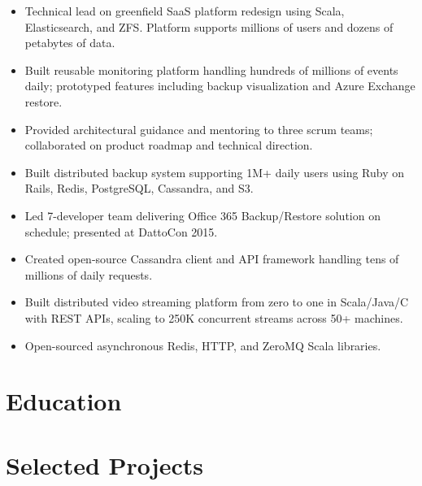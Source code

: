 \documentclass[11pt,a4paper,sans]{moderncv}
\begin{document}
{ \begin{itemize} \itemsep -2pt
  \item Technical lead on greenfield SaaS platform redesign using Scala, Elasticsearch, and ZFS. Platform supports millions of users and dozens of petabytes of data.
  \item Built reusable monitoring platform handling hundreds of millions of events daily; prototyped features including backup visualization and Azure Exchange restore.
  \item Provided architectural guidance and mentoring to three scrum teams; collaborated on product roadmap and technical direction.
 \end{itemize} }

{ \begin{itemize} \itemsep -2pt
  \item Built distributed backup system supporting 1M+ daily users using Ruby on Rails, Redis, PostgreSQL, Cassandra, and S3.
  \item Led 7-developer team delivering Office 365 Backup/Restore solution on schedule; presented at DattoCon 2015.
  \item Created open-source Cassandra client and API framework handling tens of millions of daily requests.
\end{itemize} }

{ \begin{itemize} \itemsep -2pt
  \item Built distributed video streaming platform from zero to one in Scala/Java/C with REST APIs, scaling to 250K concurrent streams across 50+ machines.
  \item Open-sourced asynchronous Redis, HTTP, and ZeroMQ Scala libraries.
\end{itemize} }


\section{\textbf{Education}}

\section{\textbf{Selected Projects}}
\end{document}
